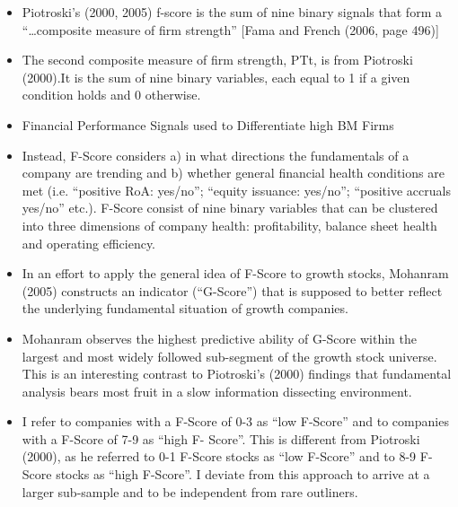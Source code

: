 \documentclass[12pt]{article}
\begin{document}
        \begin{itemize}

            \item Piotroski’s (2000, 2005) f-score is the sum of nine binary signals that form a “…composite measure of firm strength” [Fama and French (2006, page 496)] \citep{Choi2012}

            \item The second composite measure of firm strength, PTt, is from Piotroski (2000).It is the sum of nine binary variables, each equal to 1 if a given condition holds and 0 otherwise.\citep{Fama2006}

            \item Financial Performance Signals used to Differentiate high BM Firms \citep{Piotroski2000}

            \item Instead, F-Score considers a) in what directions the fundamentals of a company are trending and b) whether general financial health conditions are met (i.e. “positive RoA: yes/no”; “equity issuance: yes/no”; “positive accruals yes/no” etc.). F-Score consist of nine binary variables that can be clustered into three dimensions of company health: profitability, balance sheet health and operating efficiency.\citep{Mohr2012}
        
            \item In an effort to apply the general idea of F-Score to growth stocks, Mohanram (2005) constructs an indicator (“G-Score”) that is supposed to better reflect the underlying fundamental situation of growth companies. \citep{Mohr2012}

            \item Mohanram observes the highest predictive ability of G-Score within the largest and most widely followed sub-segment of the growth stock universe. This is an interesting contrast to Piotroski’s (2000) findings that fundamental analysis bears most fruit in a slow information dissecting environment. \citep{Mohr2012}

            \item I refer to companies with a F-Score of 0-3 as “low F-Score” and to companies with a F-Score of 7-9 as “high F- Score”. This is different from Piotroski (2000), as he referred to 0-1 F-Score stocks as “low F-Score” and to 8-9 F-Score stocks as “high F-Score”. I deviate from this approach to arrive at a larger sub-sample and to be independent from rare outliners. \citep{Mohr2012}
        \end{itemize}
\end{document}
